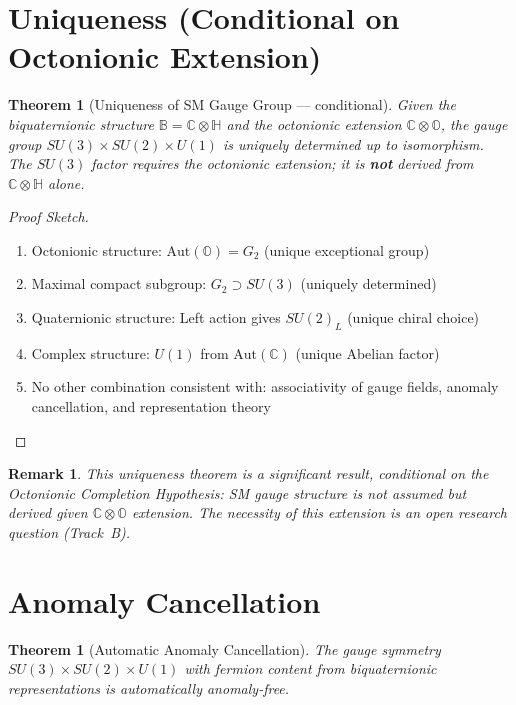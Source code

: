 \documentclass[12pt]{article}
\newtheorem{theorem}[definition]{Theorem}
\newtheorem{remark}[definition]{Remark}
\newcommand{\B}{\mathbb{B}}
\newcommand{\C}{\mathbb{C}}
\renewcommand{\H}{\mathbb{H}}
\renewcommand{\O}{\mathbb{O}}
\newcommand{\Aut}{\mathrm{Aut}}
\begin{document}
\section{Uniqueness (Conditional on Octonionic Extension)}

\begin{theorem}[Uniqueness of SM Gauge Group — conditional]
Given the biquaternionic structure $\B = \C \otimes \H$ \emph{and} the octonionic extension $\C \otimes \O$, the gauge group $SU(3) \times SU(2) \times U(1)$ is \emph{uniquely determined} up to isomorphism.
The $SU(3)$ factor requires the octonionic extension; it is \textbf{not} derived from $\C \otimes \H$ alone.
\end{theorem}

\begin{proof}[Proof Sketch]
\begin{enumerate}
\item Octonionic structure: $\Aut(\O) = G_2$ (unique exceptional group)
\item Maximal compact subgroup: $G_2 \supset SU(3)$ (uniquely determined)
\item Quaternionic structure: Left action gives $SU(2)_L$ (unique chiral choice)
\item Complex structure: $U(1)$ from $\Aut(\C)$ (unique Abelian factor)
\item No other combination consistent with: associativity of gauge fields, anomaly cancellation, and representation theory
\end{enumerate}
\end{proof}

\begin{remark}
This uniqueness theorem is a significant result, \emph{conditional} on the Octonionic Completion Hypothesis: SM gauge structure is not assumed but \emph{derived} given $\C \otimes \O$ extension. The necessity of this extension is an open research question (Track~B).
\end{remark}

\section{Anomaly Cancellation}

\begin{theorem}[Automatic Anomaly Cancellation]
The gauge symmetry $SU(3) \times SU(2) \times U(1)$ with fermion content from biquaternionic representations is automatically anomaly-free.
\end{theorem}
\end{document}

